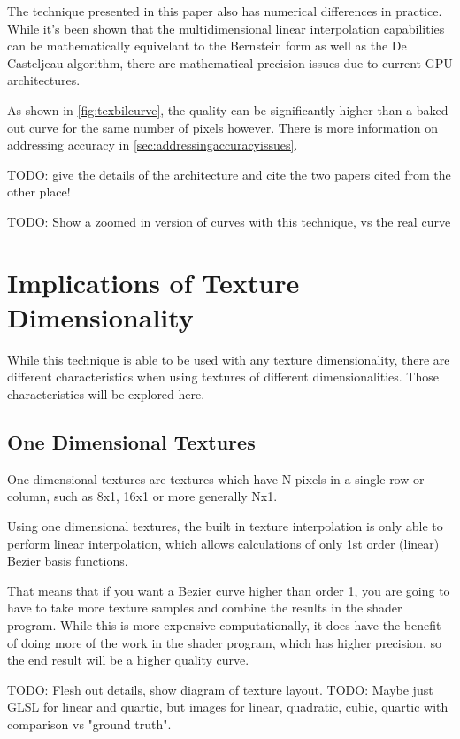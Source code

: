 \documentclass{jcgt}
\begin{document}
The technique presented in this paper also has numerical differences in practice.  While it's been shown that the multidimensional linear interpolation capabilities can be mathematically equivelant to the Bernstein form as well as the De Casteljeau algorithm, there are mathematical precision issues due to current GPU architectures.

As shown in \autoref{fig:texbilcurve}, the quality can be significantly higher than a baked out curve for the same number of pixels however.  There is more information on addressing accuracy in \autoref{sec:addressingaccuracyissues}.

TODO: give the details of the architecture and cite the two papers cited from the other place!

TODO: Show a zoomed in version of curves with this technique, vs the real curve

\section{Implications of Texture Dimensionality}
\label{sec:implicationsoftexturedimensionality}

While this technique is able to be used with any texture dimensionality, there are different characteristics when using textures of different dimensionalities.  Those characteristics will be explored here.

\subsection{One Dimensional Textures}

One dimensional textures are textures which have N pixels in a single row or column, such as 8x1, 16x1 or more generally Nx1.

Using one dimensional textures, the built in texture interpolation is only able to perform linear interpolation, which allows calculations of only 1st order (linear) Bezier basis functions.

That means that if you want a Bezier curve higher than order 1, you are going to have to take more texture samples and combine the results in the shader program.  While this is more expensive computationally, it does have the benefit of doing more of the work in the shader program, which has higher precision, so the end result will be a higher quality curve.

TODO: Flesh out details, show diagram of texture layout.
TODO: Maybe just GLSL for linear and quartic, but images for linear, quadratic, cubic, quartic with comparison vs "ground truth".
\end{document}
